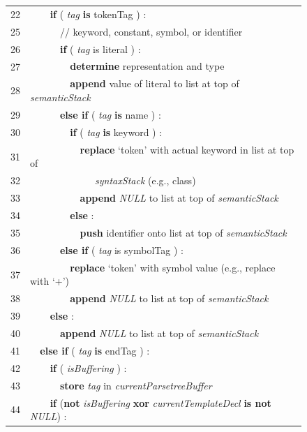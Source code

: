 \begin{figure}[ph]
\begin{tabular}{m{}m{}}
 22 & \verb+    +\textsf{\textbf{if} ( \emph{tag} \textbf{is} tokenTag ) :} \\
 25 & \verb+      +\textsf{// keyword, constant, symbol, or identifier} \\
 26 & \verb+      +\textsf{\textbf{if} ( \emph{tag} is literal ) :} \\
 27 & \verb+        +\textsf{\textbf{determine} representation and type} \\
 28 & \verb+        +\textsf{\textbf{append} value of literal to list at top of \emph{semanticStack}} \\
 29 & \verb+      +\textsf{\textbf{else if} ( \emph{tag} \textbf{is} name ) :} \\
 30 & \verb+        +\textsf{\textbf{if} ( \emph{tag} \textbf{is} keyword ) :} \\
 31 & \verb+          +\textsf{\textbf{replace} `token' with actual keyword in list at top of} \\
 32 & \verb+             +\textsf{\emph{syntaxStack} (e.g., class)} \\
 33 & \verb+          +\textsf{\textbf{append} \emph{NULL} to list at top of \emph{semanticStack}} \\
 34 & \verb+        +\textsf{\textbf{else} :} \\
 35 & \verb+          +\textsf{\textbf{push} identifier onto list at top of \emph{semanticStack}} \\
 36 & \verb+      +\textsf{\textbf{else if} ( \emph{tag} is symbolTag ) :} \\
 37 & \verb+        +\textsf{\textbf{replace} `token' with symbol value (e.g., replace with `+')} \\
 38 & \verb+        +\textsf{\textbf{append} \emph{NULL} to list at top of \emph{semanticStack}} \\
 39 & \verb+    +\textsf{\textbf{else} :} \\
 40 & \verb+      +\textsf{\textbf{append} \emph{NULL} to list at top of \emph{semanticStack}} \\
 41 & \verb+  +\textsf{\textbf{else if} ( \emph{tag} \textbf{is} endTag ) :} \\
 42 & \verb+    +\textsf{\textbf{if} ( \emph{isBuffering} ) :} \\
 43 & \verb+      +\textsf{\textbf{store} \emph{tag} in \emph{currentParsetreeBuffer}} \\
 44 & \verb+    +\textsf{\textbf{if} (\textbf{not} \emph{isBuffering} \textbf{xor} \emph{currentTemplateDecl} \textbf{is not} \emph{NULL}) :} \\

\end{tabular}
\end{figure}
